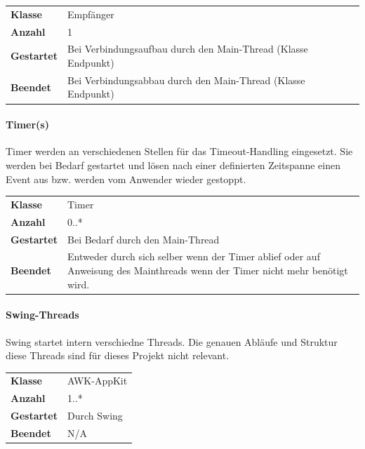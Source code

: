 \documentclass[12pt,halfparskip]{scrartcl}
\begin{document}
\begin{tabular}{@{} l p{12.5cm}}
\textbf{Klasse}       & Empfänger \\
\textbf{Anzahl}       & 1 \\
\textbf{Gestartet}    & Bei Verbindungsaufbau durch den Main-Thread (Klasse Endpunkt) \\
\textbf{Beendet}      & Bei Verbindungsabbau durch den Main-Thread (Klasse Endpunkt)
\end{tabular}


\paragraph{Timer(s)} %
\label{ssub:timer_s_}

Timer werden an verschiedenen Stellen für das Timeout-Handling eingesetzt. Sie werden bei Bedarf gestartet und lösen nach einer definierten Zeitspanne einen Event aus bzw. werden vom Anwender wieder gestoppt.

\begin{tabular}{@{} l p{12.5cm}}
\textbf{Klasse}       & Timer \\
\textbf{Anzahl}       & 0..* \\
\textbf{Gestartet}    & Bei Bedarf durch den Main-Thread \\
\textbf{Beendet}      & Entweder durch sich selber wenn der Timer ablief oder auf Anweisung des Mainthreads wenn der Timer nicht mehr benötigt wird. 
\end{tabular}


\paragraph{Swing-Threads} %
\label{ssub:swing_threads}

Swing startet intern verschiedne Threads. Die genauen Abläufe und Struktur diese Threads sind für dieses Projekt nicht relevant.

\begin{tabular}{@{} l p{12.5cm}}
\textbf{Klasse}       & AWK-AppKit \\
\textbf{Anzahl}       & 1..* \\
\textbf{Gestartet}    & Durch Swing \\
\textbf{Beendet}      & N/A
\end{tabular}

\end{document}
